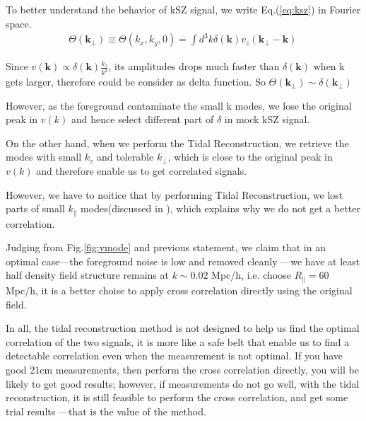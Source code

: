 To better understand the behavior of kSZ signal, we write Eq.(\ref{eq:ksz}) in Fourier space.\begin{eqnarray}
\Theta(\bm{k_\perp})\equiv \Theta(k_x,k_y,0)=\int d^3k \delta(\bm{k}) v_z(\bm{k_\perp}-\bm{k})\,
\end{eqnarray}

Since $v(\bm{k})\propto \delta(\bm{k})\frac{k_z}{k^2}$, 
its amplitudes drops much faster than $\delta(\bm{k})$ when k gets larger, 
therefore could be consider as delta function. So $\Theta(\bm{k_\perp})\sim\delta(\bm{k_\perp})$

However, as the foreground contaminate the small k modes, we lose the original peak in $v(k)$ and hence select different part of $\delta$ in mock kSZ signal.

On the other hand, when we perform the Tidal Reconstruction, we retrieve the modes with small $k_z$ and tolerable $k_\perp$, 
which is close to the original peak in $v(k)$ and therefore enable us to get correlated signals.

However, we have to noitice that by performing Tidal Reconstruction, 
we lost parts of small $k_\parallel$ modes(discussed in \cite{2015:zhu}), 
which explains why we do not get a better correlation.

Judging from Fig.\ref{fig:vmode} and previous statement, 
we claim that in an optimal case---the foreground noise is low and removed cleanly
---we have at least half density field structure remains at $k\sim 0.02$ Mpc/h, i.e. choose $R_\parallel=60$ Mpc/h, 
it is a better choise to apply cross correlation directly using the original field.

In all, the tidal reconstruction method is not designed to help us find the optimal correlation of the two signals, 
it is more like a safe belt that enable us to find a detectable correlation even when the measurement is not optimal. 
If you have good 21cm measurements, then perform the cross correlation directly, you will be likely to get good results; 
however, if measurements do not go well, with the tidal reconstruction, 
it is still feasible to perform the cross correlation, and get some trial results
---that is the value of the method.


